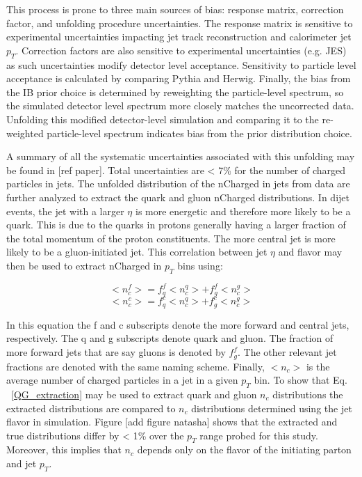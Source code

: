 This process is prone to three main sources of bias: response matrix, correction factor, and unfolding procedure uncertainties. The response matrix is sensitive to experimental uncertainties impacting jet track reconstruction and calorimeter jet $p_{T}$. Correction factors are also sensitive to experimental uncertainties (e.g. JES) as such uncertainties modify detector level acceptance. Sensitivity to particle level acceptance is calculated by comparing Pythia and Herwig. Finally, the bias from the IB prior choice is determined by reweighting the particle-level spectrum, so the simulated detector level spectrum more closely matches the uncorrected data. Unfolding this modified detector-level simulation and comparing it to the re-weighted particle-level spectrum indicates bias from the prior distribution choice.

A summary of all the systematic uncertainties associated with this unfolding may be found in [ref paper]. Total uncertainties are < 7\% for the number of charged particles in jets. The unfolded distribution of the nCharged in jets from data are further analyzed to extract the quark and gluon nCharged distributions. In dijet events, the jet with a larger $\eta$ is more energetic and therefore more likely to be a quark. This is due to the quarks in protons generally having a larger fraction of the total momentum of the proton constituents. The more central jet is more likely to be a gluon-initiated jet. This correlation between jet $\eta$ and flavor may then be used to extract nCharged in $p_{T}$ bins using:

\begin{equation}
<n_{c}^{f}> = f_{q}^{f}<n_{c}^{q}> + f^{f}_{g}<n_{c}^{g}>
\end{equation}
\begin{equation}
<n_{c}^{c}> = f_{q}^{c}<n_{c}^{q}> + f^{c}_{g}<n_{c}^{g}> 
\end{equation}


In this equation the f and c subscripts denote the more forward and central jets, respectively. The q and g subscripts denote quark and gluon. The fraction of more forward jets that are say gluons is denoted by $f_{g}^{f}$. The other relevant jet fractions are denoted with the same naming scheme. Finally, $<n_{c}>$ is the average number of charged particles in a jet in a given $p_{T}$ bin. To show that Eq. ~\eqref{QG_extraction} may be used to extract quark and gluon $n_{c}$ distributions the extracted distributions are compared to $n_{c}$ distributions determined using the jet flavor in simulation. Figure [add figure natasha] shows that the extracted and true distributions differ by < 1\% over the $p_{T}$ range probed for this study. Moreover, this implies that $n_{c}$ depends only on the flavor of the initiating parton and jet $p_{T}$. 

